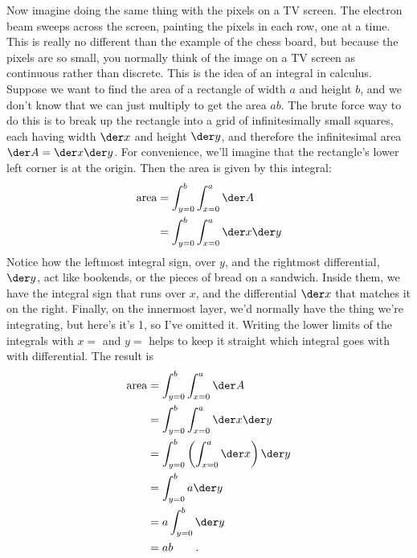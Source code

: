 Now imagine doing the same thing with the pixels on a TV screen. The electron
beam sweeps across the screen, painting the pixels in each row, one at a time.
This is really no different than the example of the chess board, but because the
pixels are so small, you normally think of the image on a TV screen as continuous
rather than discrete.
This is the idea of an integral in calculus.
Suppose we want to find the area of a rectangle of width
$a$ and height $b$, and we don't know that we can just multiply to get the
area $ab$. The brute force way to do this is to break up the rectangle into
a grid of infinitesimally small squares, each having width $\der x$ and
height $\der y$, and therefore the infinitesimal area $\der A = \der x \der y$.
For convenience, we'll imagine that the rectangle's
lower left corner is at the origin. Then the area is given by this integral:
\begin{align*}
  \text{area} &= \int_{y=0}^b \int_{x=0}^a \der A \\
              &= \int_{y=0}^b \int_{x=0}^a \der x \der y 
\end{align*}
Notice how the leftmost integral sign, over $y$, and the rightmost differential, $\der y$,
act like bookends, or the pieces of bread on a sandwich. Inside them, we have
the integral sign that runs over $x$, and the differential $\der x$ that matches
it on the right. Finally, on the innermost layer, we'd normally
have the thing we're integrating, but here's it's 1, so I've omitted it. Writing the
lower limits of the integrals with $x=$ and $y=$ helps to keep it straight which
integral goes with with differential. The result is
\begin{align*}
  \text{area} &= \int_{y=0}^b \int_{x=0}^a \der A \\
              &= \int_{y=0}^b \int_{x=0}^a \der x \der y \\
              &= \int_{y=0}^b \left(\int_{x=0}^a \der x\right) \der y \\
              &= \int_{y=0}^b a \der y \\
              &= a \int_{y=0}^b \der y \\
              &= ab \qquad .
\end{align*}

